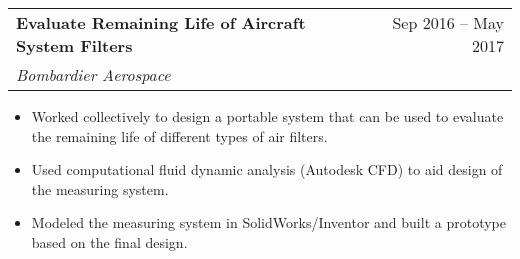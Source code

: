 \documentclass[a4paper,20pt]{article}
\makeatletter
\newcommand{\resumeItem}[2]{
  \item\small{
    #1 {#2 \vspace{-2pt}}
  }
}
\newcommand{\resumeSubheading}[4]{
  \vspace{-1pt}
    \begin{tabular*}{0.97\textwidth}{l@{\extracolsep{\fill}}r}
      #1 & #2 \\
      \textit{#3} & #4 \\
    \end{tabular*}\vspace{0pt}
}
\newcommand{\resumeSubHeadingListEnd}{}
\newcommand{\resumeItemListStart}{\begin{itemize}[itemsep=0pt]\vspace{-5pt}}
\newcommand{\resumeItemListEnd}{\end{itemize}\vspace{-5pt}}
\makeatother
\begin{document}
\vspace{1pt}

    \resumeSubheading{\textbf{Evaluate Remaining Life of Aircraft System Filters} }{Sep 2016 – May 2017}
    {Bombardier Aerospace}{}
    
    \resumeItemListStart
        \resumeItem{}
        {Worked collectively to design a portable system that can be used to evaluate the remaining life of different types of air filters.}
        \resumeItem{}
        {Used computational fluid dynamic analysis (Autodesk CFD) to aid design of the measuring system.}
        \resumeItem{}
        {Modeled the measuring system in SolidWorks/Inventor and built a prototype based on the final design.}
    \resumeItemListEnd

\resumeSubHeadingListEnd
\end{document}
